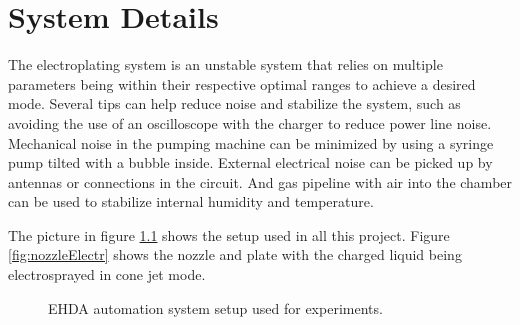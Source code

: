 \chapter{System Details}


The electroplating system is an unstable system that relies on multiple parameters being within their respective optimal ranges to achieve a desired mode. 
Several tips can help reduce noise and stabilize the system, such as avoiding the use of an oscilloscope with the charger to reduce power line noise. 
Mechanical noise in the pumping machine can be minimized by using a syringe pump tilted with a bubble inside. 
External electrical noise can be picked up by antennas or connections in the circuit. 
And gas pipeline with air into the chamber can be used to stabilize internal humidity and temperature.

The picture in figure \ref{fig:setup_pic} shows the setup used in all this project. Figure \ref{fig:nozzleElectr} shows the nozzle and plate with the charged liquid being electrosprayed in cone jet mode.

\begin{figure}[H]
  \centering
  \caption{EHDA automation system setup used for experiments.}
  \label{fig:setup_pic}
\end{figure}

